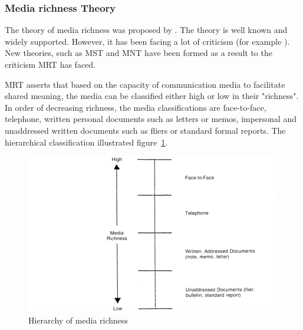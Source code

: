 \documentclass[english,12pt,a4paper,pdftex]{article}
\begin{document}
\subsubsection{Media richness Theory}

The theory of media richness was proposed by \citet{daft1986}. The theory is well known and widely supported. However, it has been facing a lot of criticism (for example \citep{elshinnawy1997} \citep{dennis1999} \citep{korkala2006}). New theories, such as \ac{MST} and \ac{MNT} have been formed as a result to the criticism \ac{MRT} has faced.

\ac{MRT} asserts that based on the capacity of communication media to facilitate shared meaning, the media can be classified either high or low in their "richness". In order of decreasing richness, the media classifications are face-to-face, telephone, written personal documents such as letters or memos, impersonal and unaddressed written documents such as fliers or standard formal reports. The hierarchical classification illustrated figure~\ref{fig:hierarchy_of_media_richness}.

\begin{figure}[htb]
\begin{center}
\includegraphics[width=1.0\textwidth]{hierarchy_of_media_richness.png}
\end{center}
\caption{Hierarchy of media richness \citep{daft1987}}
\label{fig:hierarchy_of_media_richness}
\end{figure}
\end{document}
